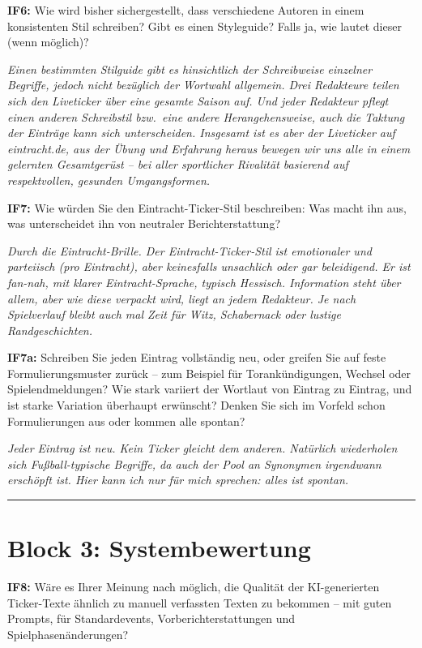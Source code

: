 \textbf{IF6:} Wie wird bisher sichergestellt, dass verschiedene Autoren in einem konsistenten Stil schreiben? Gibt es einen Styleguide? Falls ja, wie lautet dieser (wenn möglich)?

\textit{Einen bestimmten Stilguide gibt es hinsichtlich der Schreibweise einzelner Begriffe, jedoch nicht bezüglich der Wortwahl allgemein. Drei Redakteure teilen sich den Liveticker über eine gesamte Saison auf. Und jeder Redakteur pflegt einen anderen Schreibstil bzw.\ eine andere Herangehensweise, auch die Taktung der Einträge kann sich unterscheiden. Insgesamt ist es aber der Liveticker auf eintracht.de, aus der Übung und Erfahrung heraus bewegen wir uns alle in einem gelernten Gesamtgerüst -- bei aller sportlicher Rivalität basierend auf respektvollen, gesunden Umgangsformen.}

\textbf{IF7:} Wie würden Sie den Eintracht-Ticker-Stil beschreiben: Was macht ihn aus, was unterscheidet ihn von neutraler Berichterstattung?

\textit{Durch die Eintracht-Brille. Der Eintracht-Ticker-Stil ist emotionaler und parteiisch (pro Eintracht), aber keinesfalls unsachlich oder gar beleidigend. Er ist fan-nah, mit klarer Eintracht-Sprache, typisch Hessisch. Information steht über allem, aber wie diese verpackt wird, liegt an jedem Redakteur. Je nach Spielverlauf bleibt auch mal Zeit für Witz, Schabernack oder lustige Randgeschichten.}

\textbf{IF7a:} Schreiben Sie jeden Eintrag vollständig neu, oder greifen Sie auf feste Formulierungsmuster zurück -- zum Beispiel für Torankündigungen, Wechsel oder Spielendmeldungen? Wie stark variiert der Wortlaut von Eintrag zu Eintrag, und ist starke Variation überhaupt erwünscht? Denken Sie sich im Vorfeld schon Formulierungen aus oder kommen alle spontan?

\textit{Jeder Eintrag ist neu. Kein Ticker gleicht dem anderen. Natürlich wiederholen sich Fußball-typische Begriffe, da auch der Pool an Synonymen irgendwann erschöpft ist. Hier kann ich nur für mich sprechen: alles ist spontan.}

\begin{center}\rule{0.5\linewidth}{0.5pt}\end{center}

\section{Block 3: Systembewertung}

\textbf{IF8:} Wäre es Ihrer Meinung nach möglich, die Qualität der KI-generierten Ticker-Texte ähnlich zu manuell verfassten Texten zu bekommen -- mit guten Prompts, für Standardevents, Vorberichterstattungen und Spielphasenänderungen?

